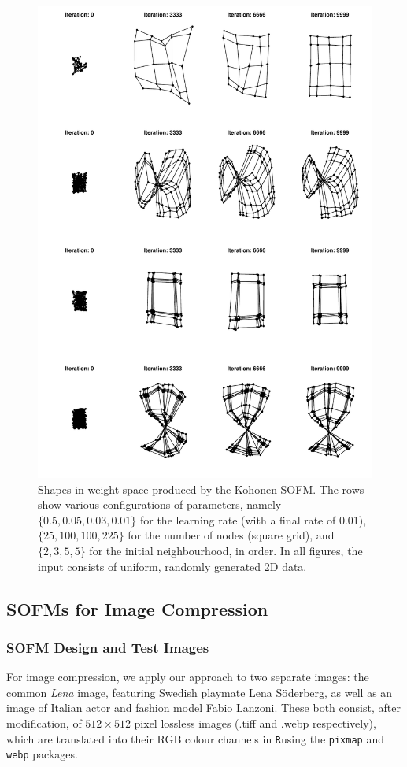 \documentclass[10pt, twocolumn]{article}\usepackage[]{graphicx}\usepackage[]{color}
\theoremstyle{plain}
\newcommand{\R}{\texttt{R}}
\begin{document}
    \begin{figure}[p]
      \centering
      \includegraphics[scale=.7]{koh_shapes.pdf}
      \caption{Shapes in weight-space produced by the Kohonen SOFM. The rows show various configurations of parameters, namely $\{0.5, 0.05, 0.03, 0.01\}$ for the learning rate (with a final rate of 0.01),  $\{25, 100, 100, 225\}$ for the number of nodes (square grid), and $\{2, 3, 5, 5\}$ for the initial neighbourhood, in order. In all figures, the input consists of uniform, randomly generated 2D data.}
      \label{fig:shapes}
    \end{figure}
    
  \subsection{SOFMs for Image Compression}
    \subsubsection{SOFM Design and Test Images}
    For image compression, we apply our approach to two separate images: the common \textit{Lena} image, featuring Swedish playmate Lena Söderberg, as well as an image of Italian actor and fashion model Fabio Lanzoni. These both consist, after modification, of $512 \times 512$ pixel lossless images (.tiff and .webp respectively), which are translated into their RGB colour channels in \R using the \texttt{pixmap} and \texttt{webp} packages.
  
\end{document}

